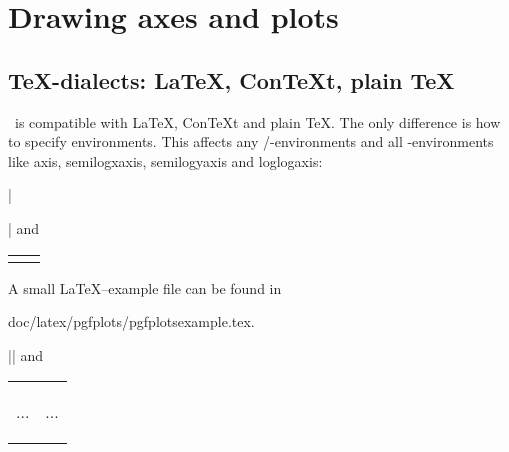 
\section{Drawing axes and plots}
\subsection{\TeX-dialects: \LaTeX, Con{\TeX}t, plain \TeX }
\label{sec:tex:dialects}%
\PGFPlots\ is compatible with \LaTeX, Con{\TeX}t and plain \TeX. The only difference is how to specify environments. This affects any \PGF/\Tikz-environments and all \PGFPlots-environments like axis, semilogxaxis, semilogyaxis and loglogaxis:
\begin{description}
\def\HEAD{%
	\small
	\lstset{boxpos=b,breaklines=false,aboveskip=3pt,belowskip=3pt}%
	\begin{tabular}{*{2}{p{4cm}}}%
}%
\item[\LaTeX:] |\usepackage{pgfplots}| and

{\HEAD
\begin{codeexample}
\begin{tikzpicture}
\begin{axis}
...
\end{axis}
\end{tikzpicture}
\end{codeexample}
&
\begin{codeexample}
\begin{tikzpicture}
\begin{semilogxaxis}
...
\end{semilogxaxis}
\end{tikzpicture}
\end{codeexample}
\\
\end{tabular}%
}

A small \LaTeX--example file can be found in
\begin{codeexample}
doc/latex/pgfplots/pgfplotsexample.tex.
\end{codeexample}

\item[Con{\TeX}t:] |\usemodule[pgfplots]| and

{\HEAD
\begin{codeexample}
\starttikzpicture
\startaxis
...
\stopaxis
\stoptikzpicture
\end{codeexample}
&
\begin{codeexample}
\starttikzpicture
\startsemilogxaxis
...
\stopsemilogxaxis
\stoptikzpicture
\end{codeexample}
\\
\end{tabular}%
}


\end{description}
